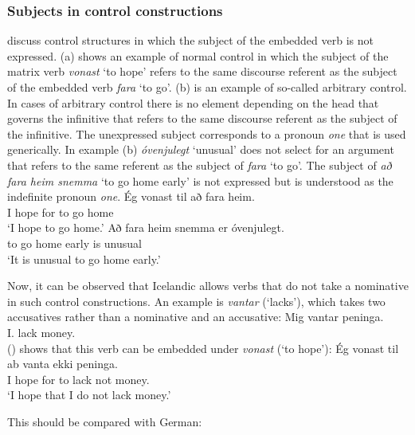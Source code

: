 \subsubsection{Subjects in control constructions}
\label{sec-subject-control}

\citet*[Section~2.7]{ZMT85a} discuss control structures in which the subject of the embedded verb is
not expressed. (a) shows an example of normal control in which the subject of the matrix verb
\emph{vonast} `to hope' refers to the same discourse referent as the subject of the embedded verb \emph{fara} `to
go'. (b) is an example of so-called arbitrary control. In cases of arbitrary control there is
no element depending on the head that governs the infinitive that refers to the same discourse
referent as the subject of the infinitive. The unexpressed subject corresponds to a pronoun \emph{one} that is
used generically. In example (b) \emph{óvenjulegt} `unusual' does not select for an argument
that refers to the same referent as the subject of \emph{fara} `to go'. The subject of \emph{að fara
  heim snemma} `to go home early' is not expressed but is understood as the indefinite pronoun \emph{one}.
\eal
\ex
\gll Ég  vonast til að fara heim.\\
     I   hope   for to go   home\\
\glt `I hope to go home.'
\ex
\gll Að fara heim snemma er óvenjulegt.\\
     to go home   early is unusual\\
\glt `It is unusual to go home early.'
\zl

Now, it can be observed that Icelandic allows verbs that do not take a nominative in such control
constructions. An example is \emph{vantar} (`lacks'), which takes two accusatives rather than a
nominative and an accusative:
\ea
\gll Mig      vantar peninga.\\
     I.\ACC{} lack   money.\ACC\\
\z
() shows that this verb can be embedded under \emph{vonast} (`to hope'):
\ea
\gll Ég  vonast til ab vanta ekki peninga.\\
     I hope  for to lack not money.\ACC\\
\glt `I hope that I do not lack money.'
\z

This should be compared with German:
\eal
{}
\zl


